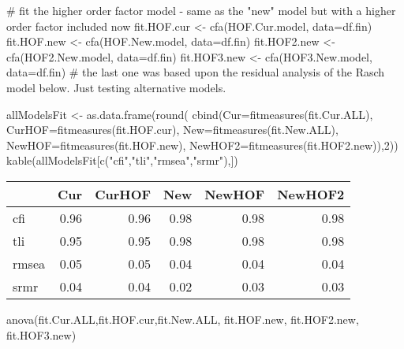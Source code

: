 \documentclass[
  letterpaper,
  DIV=11,
  numbers=noendperiod]{scrartcl}
\newenvironment{Shaded}{\begin{snugshade}}{\end{snugshade}}
\newcommand{\AttributeTok}[1]{\textcolor[rgb]{0.40,0.45,0.13}{#1}}
\newcommand{\CommentTok}[1]{\textcolor[rgb]{0.37,0.37,0.37}{#1}}
\newcommand{\DecValTok}[1]{\textcolor[rgb]{0.68,0.00,0.00}{#1}}
\newcommand{\FunctionTok}[1]{\textcolor[rgb]{0.28,0.35,0.67}{#1}}
\newcommand{\NormalTok}[1]{\textcolor[rgb]{0.00,0.23,0.31}{#1}}
\newcommand{\OtherTok}[1]{\textcolor[rgb]{0.00,0.23,0.31}{#1}}
\newcommand{\StringTok}[1]{\textcolor[rgb]{0.13,0.47,0.30}{#1}}
\begin{document}
\begin{Shaded}
\begin{Highlighting}[]
\CommentTok{\# fit the higher order factor model {-} same as the "new" model but with a higher order factor included now}
\NormalTok{fit.HOF.cur }\OtherTok{\textless{}{-}} \FunctionTok{cfa}\NormalTok{(HOF.Cur.model, }\AttributeTok{data=}\NormalTok{df.fin)}
\NormalTok{fit.HOF.new }\OtherTok{\textless{}{-}} \FunctionTok{cfa}\NormalTok{(HOF.New.model, }\AttributeTok{data=}\NormalTok{df.fin)}
\NormalTok{fit.HOF2.new }\OtherTok{\textless{}{-}} \FunctionTok{cfa}\NormalTok{(HOF2.New.model, }\AttributeTok{data=}\NormalTok{df.fin)}
\NormalTok{fit.HOF3.new }\OtherTok{\textless{}{-}} \FunctionTok{cfa}\NormalTok{(HOF3.New.model, }\AttributeTok{data=}\NormalTok{df.fin)}
\CommentTok{\# the last one was based upon the residual analysis of the Rasch model below.  Just testing alternative models.}


\NormalTok{allModelsFit }\OtherTok{\textless{}{-}} \FunctionTok{as.data.frame}\NormalTok{(}\FunctionTok{round}\NormalTok{(}
  \FunctionTok{cbind}\NormalTok{(}\AttributeTok{Cur=}\FunctionTok{fitmeasures}\NormalTok{(fit.Cur.ALL),}
        \AttributeTok{CurHOF=}\FunctionTok{fitmeasures}\NormalTok{(fit.HOF.cur),}
        \AttributeTok{New=}\FunctionTok{fitmeasures}\NormalTok{(fit.New.ALL),}
        \AttributeTok{NewHOF=}\FunctionTok{fitmeasures}\NormalTok{(fit.HOF.new),}
        \AttributeTok{NewHOF2=}\FunctionTok{fitmeasures}\NormalTok{(fit.HOF2.new)),}\DecValTok{2}\NormalTok{))}
\FunctionTok{kable}\NormalTok{(allModelsFit[}\FunctionTok{c}\NormalTok{(}\StringTok{"cfi"}\NormalTok{,}\StringTok{"tli"}\NormalTok{,}\StringTok{"rmsea"}\NormalTok{,}\StringTok{"srmr"}\NormalTok{),])}
\end{Highlighting}
\end{Shaded}

\begin{longtable}[]{@{}lrrrrr@{}}
\toprule\noalign{}
& Cur & CurHOF & New & NewHOF & NewHOF2 \\
\midrule\noalign{}
\endhead
\bottomrule\noalign{}
\endlastfoot
cfi & 0.96 & 0.96 & 0.98 & 0.98 & 0.98 \\
tli & 0.95 & 0.95 & 0.98 & 0.98 & 0.98 \\
rmsea & 0.05 & 0.05 & 0.04 & 0.04 & 0.04 \\
srmr & 0.04 & 0.04 & 0.02 & 0.03 & 0.03 \\
\end{longtable}

\begin{Shaded}
\begin{Highlighting}[]
\FunctionTok{anova}\NormalTok{(fit.Cur.ALL,fit.HOF.cur,fit.New.ALL, fit.HOF.new, fit.HOF2.new, fit.HOF3.new)}
\end{Highlighting}
\end{Shaded}
\end{document}
